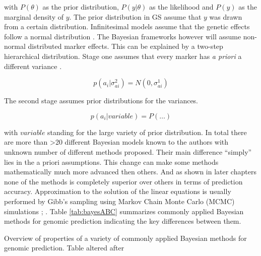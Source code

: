 with $P(\theta )$ as the prior distribution, $P(y|\theta )$ as the likelihood and $P(y)$ as the marginal density of $y$. The prior distribution in GS assume that $y$ was drawn from a certain distribution. Infinitesimal models assume that the genetic effects follow a normal distribution \cite{legarra2018}. The Bayesian frameworks however will assume non-normal distributed marker effects. This can be explained by a two-step hierarchical distribution.
Stage one assumes that every marker has \textit{a priori} a different variance \cite{legarra2018}.

\begin{equation}
p(a_i|\sigma_{ai}^2) = N (0,\sigma^1_{ai})
 \label{eqn:stageonbayes}
\end{equation}

The second stage assumes prior distributions for the variances.

\begin{equation}
p(a_i| variable ) = P(\dots )
 \label{eqn:stagetwobayes}
\end{equation}

with $variable$ standing for the large variety of prior distribution. In total there are more than >20
different Bayesian models known to the authors with unknown number of different methods proposed. Their main
difference ``simply'' lies in the a priori assumptions. This change can make some methods mathematically much
more advanced then others. And as shown in later chapters none of the methods is completely superior over
others in terms of prediction accuracy. Approximation to the solution of the linear equations is usually performed by Gibb's sampling using Markov Chain Monte Carlo (MCMC) simulations \cite{dlc2009}; \cite{BGLR}.
Table \ref{tab:bayesABC} summarizes commonly applied Bayesian methods for genomic prediction indicating the key differences between them. 

\begin{table}[H]
\caption{Overview of properties of a variety of commonly applied Bayesian methods for genomic prediction. Table altered after \cite{karkkainen2012back}}
\label{tab:bayesABC}
\centering
{}
\caption*{The name is given by the author. The prior column tells which shrinkage prior is used. }
\end{table}


